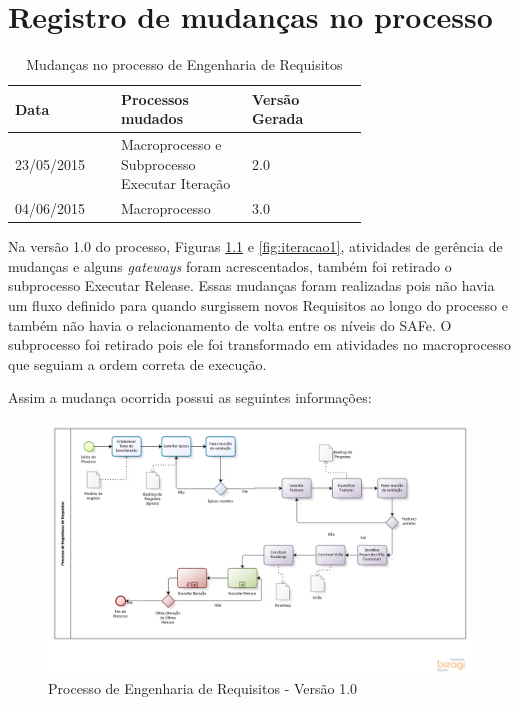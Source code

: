 \chapter{Registro de mudanças no processo}


\begin{table}[!h]
\centering
\caption{Mudanças no processo de Engenharia de Requisitos}
\label{Rotulo}
  \begin{tabular}{p{0.20\linewidth}p{0.25\linewidth}p{0.25\linewidth}}
  \hline
  Data  & Processos mudados & Versão Gerada\\
  \hline

  23/05/2015 & Macroprocesso e Subprocesso Executar Iteração & 2.0\\

  04/06/2015  & Macroprocesso & 3.0 \\

  \hline
  \end{tabular}
\end{table}

Na versão 1.0 do processo, Figuras \ref{fig:Processo1} e \ref{fig:iteracao1}, atividades de gerência de mudanças e alguns \textit{gateways} foram acrescentados, também foi retirado o subprocesso
  Executar Release. Essas mudanças foram realizadas pois não havia um fluxo definido para quando
  surgissem novos Requisitos ao longo do processo e também não havia o relacionamento de volta entre os níveis do SAFe. O subprocesso foi retirado
  pois ele foi transformado em atividades no macroprocesso que seguiam a ordem correta de execução.

Assim a mudança ocorrida possui as seguintes informações:
\begin{figure}[!htb]
\flushleft
\includegraphics[scale=0.5]{figuras/processo1.png}
\caption{Processo de Engenharia de Requisitos - Versão 1.0}
\label{fig:Processo1}
\end{figure}


